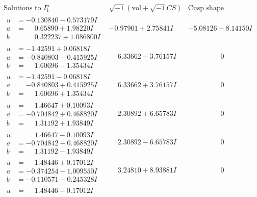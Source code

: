 \documentclass[1p]{elsarticle_modified}
\theoremstyle{definition}
\newcommand{\I}{\sqrt{-1}}
\begin{document}
$$\begin{array}{c|c|c}
\text{Solutions to }I^u_{1}& \I (\text{vol} + \sqrt{-1}CS) & \text{Cusp shape}\\
 \hline 
\begin{aligned}
u &= -0.130840 - 0.573179 I \\
a &= \phantom{-}0.65890 + 1.98220 I \\
b &= \phantom{-}0.322237 + 1.086800 I\end{aligned}
 & -0.97901 + 2.75841 I & -5.08126 - 8.14150 I \\ \hline\begin{aligned}
u &= -1.42591 + 0.06818 I \\
a &= -0.840803 - 0.415925 I \\
b &= \phantom{-}1.60696 - 1.35434 I\end{aligned}
 & \phantom{-}6.33662 - 3.76157 I & \phantom{-0.000000 } 0 \\ \hline\begin{aligned}
u &= -1.42591 - 0.06818 I \\
a &= -0.840803 + 0.415925 I \\
b &= \phantom{-}1.60696 + 1.35434 I\end{aligned}
 & \phantom{-}6.33662 + 3.76157 I & \phantom{-0.000000 } 0 \\ \hline\begin{aligned}
u &= \phantom{-}1.46647 + 0.10093 I \\
a &= -0.704842 + 0.468820 I \\
b &= \phantom{-}1.31192 + 1.93849 I\end{aligned}
 & \phantom{-}2.30892 + 6.65783 I & \phantom{-0.000000 } 0 \\ \hline\begin{aligned}
u &= \phantom{-}1.46647 - 0.10093 I \\
a &= -0.704842 - 0.468820 I \\
b &= \phantom{-}1.31192 - 1.93849 I\end{aligned}
 & \phantom{-}2.30892 - 6.65783 I & \phantom{-0.000000 } 0 \\ \hline\begin{aligned}
u &= \phantom{-}1.48446 + 0.17012 I \\
a &= -0.374254 - 1.009550 I \\
b &= -0.110571 - 0.245328 I\end{aligned}
 & \phantom{-}3.24810 + 8.93881 I & \phantom{-0.000000 } 0 \\ \hline\begin{aligned}
u &= \phantom{-}1.48446 - 0.17012 I \\

\end{aligned}
\end{array}$$
\end{document}

